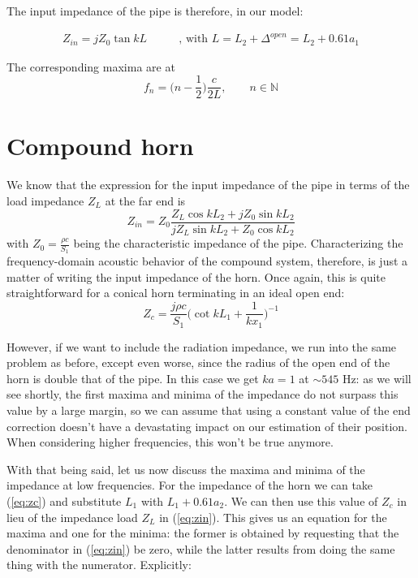 \documentclass[a4paper]{article}
\begin{document}
The input impedance of the pipe is therefore, in our model:

\begin{align*}
	Z_{in} = jZ_0 \tan{kL} \qquad & \text{, with } L = L_2 + \Delta^{open} = L_2 + 0.61a_1
\end{align*}

The corresponding maxima are at
$$ f_n = \biggl(n - \frac{1}{2}\biggr) \frac{c}{2L}, \qquad n \in \mathbb{N} $$

\section{Compound horn}
We know that the expression for the input impedance of the pipe in terms of the load impedance $Z_L$ at the far end is
\begin{equation}\label{eq:zin}
	Z_{in} = Z_0 \frac{Z_L \cos{kL_2} + jZ_0\sin{kL_2}}{jZ_L \sin{kL_2} + Z_0 \cos{kL_2}}
\end{equation}
with $Z_0 = \frac{\rho c}{S_1}$ being the characteristic impedance of the pipe. Characterizing the frequency-domain acoustic behavior of the compound system, therefore, is just a matter of writing the input impedance of the horn. Once again, this is quite straightforward for a conical horn terminating in an ideal open end:
\begin{equation}\label{eq:zc}
	Z_c = \frac{j\rho c}{S_1} \biggl( \cot{kL_1} + \frac{1}{kx_1} \biggr)^{-1}
\end{equation}

However, if we want to include the radiation impedance, we run into the same problem as before, except even worse, since the radius of the open end of the horn is double that of the pipe. In this case we get $ka = 1$ at $\sim 545$ Hz: as we will see shortly, the first maxima and minima of the impedance do not surpass this value by a large margin, so we can assume that using a constant value of the end correction doesn't have a devastating impact on our estimation of their position. When considering higher frequencies, this won't be true anymore.

With that being said, let us now discuss the maxima and minima of the impedance at low frequencies. For the impedance of the horn we can take (\ref{eq:zc}) and substitute $L_1$ with $L_1 + 0.61a_2 $. We can then use this value of $Z_c$ in lieu of the impedance load $Z_L$ in (\ref{eq:zin}). This gives us an equation for the maxima and one for the minima: the former is obtained by requesting that the denominator in (\ref{eq:zin}) be zero, while the latter results from doing the same thing with the numerator. Explicitly:
\end{document}
